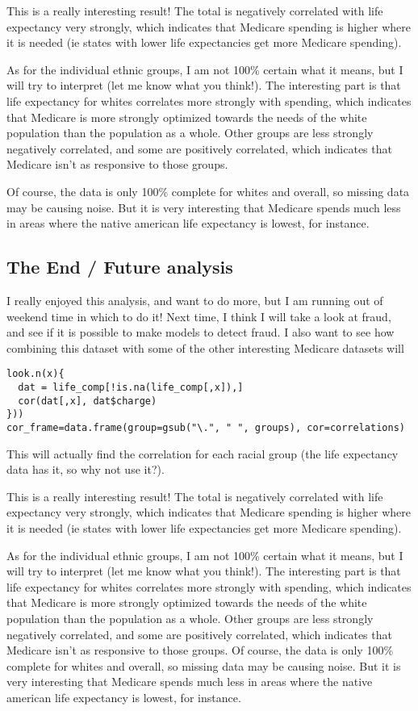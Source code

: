 This is a really interesting result! The total is negatively correlated with life expectancy very strongly, which indicates that Medicare spending is higher where it is needed (ie states with lower life expectancies get more Medicare spending).

As for the individual ethnic groups, I am not 100\% certain what it means, but I will try to interpret (let me know what you think!). The interesting part is that life expectancy for whites correlates more strongly with spending, which indicates that Medicare is more strongly optimized towards the needs of the white population than the population as a whole. Other groups are less strongly negatively correlated, and some are positively correlated, which indicates that Medicare isn't as responsive to those groups. 

Of course, the data is only 100\% complete for whites and overall, so missing data may be causing noise. But it is very interesting that Medicare spends much less in areas where the native american life expectancy is lowest, for instance.

\subsection*{The End / Future analysis}
I really enjoyed this analysis, and want to do more, but I am running out of weekend time in which to do it! Next time, I think I will take a look at fraud, and see if it is possible to make models to detect fraud. I also want to see how combining this dataset with some of the other interesting Medicare datasets will 

\begin{framed}
\begin{verbatim}
look.n(x){
  dat = life_comp[!is.na(life_comp[,x]),]
  cor(dat[,x], dat$charge)
}))
cor_frame=data.frame(group=gsub("\.", " ", groups), cor=correlations)
\end{verbatim}
\end{framed}
This will actually find the correlation for each racial group (the life expectancy data has it, so why not use it?).

This is a really interesting result! The total is negatively correlated with life expectancy very strongly, which indicates that Medicare spending is higher where it is needed (ie states with lower life expectancies get more Medicare spending).

As for the individual ethnic groups, I am not 100\% certain what it means, but I will try to interpret (let me know what you think!). The interesting part is that life expectancy for whites correlates more strongly with spending, which indicates that Medicare is more strongly optimized towards the needs of the white population than the population as a whole. Other groups are less strongly negatively correlated, and some are positively correlated, which indicates that Medicare isn't as responsive to those groups. Of course, the data is only 100\% complete for whites and overall, so missing data may be causing noise. But it is very interesting that Medicare spends much less in areas where the native american life expectancy is lowest, for instance.

